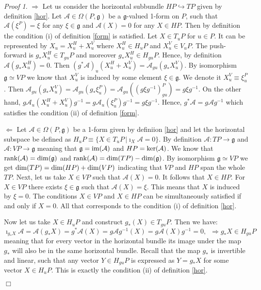 \documentclass[11pt]{report}
\theoremstyle{plain}
\theoremstyle{definition}
\theoremstyle{remark}
\theoremstyle{remark}
\newtheorem*{pr}{Proof}
\numberwithin{equation}{section}
\begin{document}
\begin{pr}

$\Longrightarrow$ Let us consider the horizontal subbundle $HP \hookrightarrow TP$ given by definition \ref{hor}. 
Let $\mathcal{A} \in \Omega(P, \mathfrak{g})$ be a $\mathfrak{g}$-valued 1-form on $P$, such that $\mathcal{A} (\xi^P) = \xi$ for any 
$\xi \in \mathfrak{g}$ and  $\mathcal{A} (X) = 0$ for any $X \in HP$. Then by definition the condition (i) of definition \ref{form} is satisfied. 
Let $X\in T_uP$ for $u\in P$. It can be represented by $X_u =X^H_u + X^V_u$ where $X^H_u \in H_uP$ and $X^V_u \in V_uP$. 
The push-forward is $g_*X^H_u \in T_{gu}P$ and moreover $g_*X^H_u \in H_{gu}P$. Hence, by definition $\mathcal{A}(g_*X^H_u)= 0$.
Then $(g^*\mathcal{A})_u(X^H_u + X^V_u) = \mathcal{A}_{gu}(g_*X^V_u)$. By isomorphism $\mathfrak{g} \simeq VP$ we know that $X^V_u$ is induced by some element $\xi \in \mathfrak{g}$. We denote it $X^V_u \equiv \xi^P_u$. Then $\mathcal{A}_{gu}(g_*X^V_u) =\mathcal{A}_{gu}(g_*\xi^P_u) = \mathcal{A}_{gu}\left( (g\xi g^{-1})^P_{gu}\right) = g\xi g^{-1}$. On the other hand, $g\mathcal{A}_u(X^H_u + X^V_u)g^{-1} = g\mathcal{A}_u(\xi^P_u)g^{-1} = g\xi g^{-1}$. Hence, $g^*\mathcal{A} = g\mathcal{A}g^{-1}$ which satisfies the condition (ii) of definition \ref{form}.



$\Longleftarrow$ 
Let $\mathcal{A} \in \Omega(P, \mathfrak{g})$ be a 1-form given by definiion \ref{hor} and let the horizontal subspace be defined as $H_uP \equiv \{X \in T_uP \, | \imath_X \mathcal{A} = 0\}$. By definition $\mathcal{A}: TP \to \mathfrak{g}$ and $\mathcal{A}: VP \to \mathfrak{g}$ meaning that $\mathfrak{g} = {\rm im}(\mathcal{A})$ and $HP = {\rm ker}(\mathcal{A})$. We know that ${\rm rank}(\mathcal{A}) = {\rm dim} (\mathfrak{g})$ and ${\rm rank}(\mathcal{A}) = {\rm dim} (TP) - {\rm dim} (\mathfrak{g})$. By isomorphism $\mathfrak{g} \simeq VP$ we get ${\rm dim} (TP) = {\rm dim} (HP) + {\rm dim} (VP)$ indicating that $VP$ and $HP$ span the whole $TP$. Next, let us take $X \in VP$ such that $\mathcal{A}(X) = 0$. It follows that $X\in HP$. For $X \in VP$  there exists $\xi \in \mathfrak{g}$ such that $\mathcal{A}(X) = \xi$. This means that $X$ is induced by $\xi = 0$. The conditions $X \in VP$ and $X\in HP$ can be simultaneously satisfied if and only if $X = 0$. All that corresponds to the condition (i) of definition \ref{hor}. 

Now let us take $X\in H_uP$ and construct $g_*(X)\in T_{gu}P$. Then we have:
$$
\imath_{g_*X}\mathcal{A} = \mathcal{A}(g_*X) = g^*\mathcal{A}(X) = g \mathcal{A} g^{-1} (X) = g \mathcal{A} (X) g^{-1}= 0, \, \, \, \Longrightarrow g_*X\in H_{gu}P
$$
meaning that for every vector in the horizontal bundle its image under the map $g_*$ will also be in the same horizontal bundle. Recall that the map $g_*$ is invertible and linear, such that any vector $Y\in H_{gu}P$ is expressed as $Y= g_*X$ for some vector $X\in H_uP$. This is exactly the condition (ii) of definition \ref{hor}.

$\Box$
\end{pr}
\end{document}
